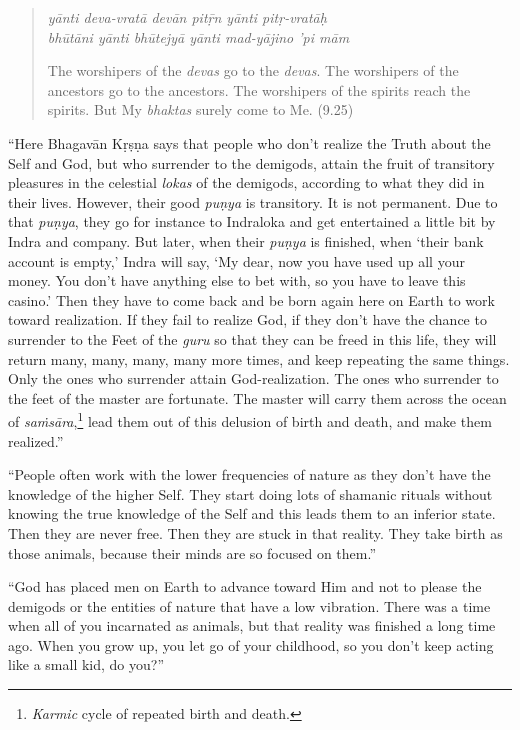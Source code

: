 \documentclass[12pt, twoside, openright]{memoir}
\begin{document}
\par
\begin{verse}
\textit{yānti deva-vratā devān pitṝn yānti pitṛ-vratāḥ} \\
\textit{bhūtāni yānti bhūtejyā yānti mad-yājino ’pi mām}

\noindent The worshipers of the \textit{devas} go to the \textit{devas}. The worshipers of the ancestors go to the ancestors. The worshipers of the spirits reach the spirits. But My \textit{bhaktas} surely come to Me. (9.25)
\end{verse}
\par


\enquote{Here Bhagavān Kṛṣṇa says that people who don’t realize the Truth about the Self and God, but who surrender to the demigods, attain the fruit of transitory pleasures in the celestial \textit{lokas} of the demigods, according to what they did in their lives. However, their good \textit{puṇya} is transitory. It is not permanent. Due to that \textit{puṇya}, they go for instance to Indraloka and get entertained a little bit by Indra and company. But later, when their \textit{puṇya} is finished, when \enquote{their bank account is empty,} Indra will say, \enquote{My dear, now you have used up all your money. You don’t have anything else to bet with, so you have to leave this casino.} Then they have to come back and be born again here on Earth to work toward realization. If they fail to realize God, if they don’t have the chance to surrender to the Feet of the \textit{guru} so that they can be freed in this life, they will return many, many, many, many more times, and keep repeating the same things. Only the ones who surrender attain God-realization. The ones who surrender to the feet of the master are fortunate. The master will carry them across the ocean of \textit{saṁsāra},\footnote{\textit{Karmic} cycle of repeated birth and death.} lead them out of this delusion of birth and death, and make them realized.}

\enquote{People often work with the lower frequencies of nature as they don’t have the knowledge of the higher Self. They start doing lots of shamanic rituals without knowing the true knowledge of the Self and this leads them to an inferior state. Then they are never free. Then they are stuck in that reality. They take birth as those animals, because their minds are so focused on them.}

\enquote{God has placed men on Earth to advance toward Him and not to please the demigods or the entities of nature that have a low vibration. There was a time when all of you incarnated as animals, but that reality was finished a long time ago. When you grow up, you let go of your childhood, so you don’t keep acting like a small kid, do you?}
\end{document}
